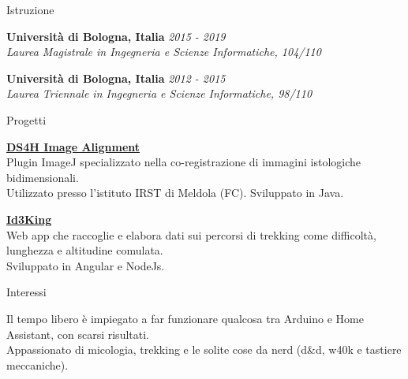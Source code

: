 \documentclass{../resume} %
\begin{document}
\begin{rSection}{Istruzione}

{\bf Università di Bologna, Italia } \hfill {\em 2015 - 2019} 
\\{ \textit {Laurea Magistrale in Ingegneria e Scienze Informatiche, 104/110 }} 

{\bf Università di Bologna, Italia } \hfill {\em 2012 - 2015} 
\\ { \textit {Laurea Triennale in Ingegneria e Scienze Informatiche, 98/110 }} \hfill


\end{rSection}


\begin{rSection}{Progetti}

{\bf \href{https://imagej.net/plugins/ds4h-image-alignment}{DS4H Image Alignment}}
\\ Plugin ImageJ specializzato nella co-registrazione di immagini istologiche bidimensionali.\\
Utilizzato presso l'istituto IRST di Meldola (FC). Sviluppato in Java.

{\bf \href{https://github.com/illeb/id3king}{Id3King}}
\\ Web app che raccoglie e elabora dati sui percorsi di trekking come difficoltà, lunghezza e altitudine comulata.\\
Sviluppato in Angular e NodeJs.

\end{rSection}


\begin{rSection}{Interessi}

  Il tempo libero è impiegato a far funzionare qualcosa tra Arduino e Home Assistant, con scarsi risultati.\\ Appassionato di micologia, trekking e le solite cose da nerd (d\&d, w40k e tastiere meccaniche).
\end{rSection}
\end{document}
